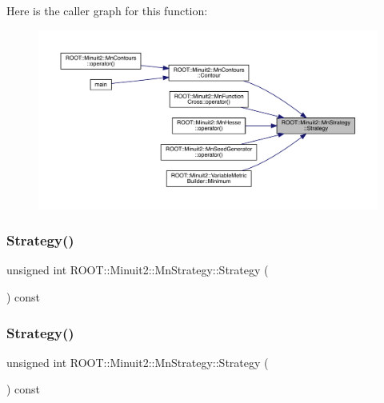 Here is the caller graph for this function\+:
\nopagebreak
\begin{figure}[H]
\begin{center}
\leavevmode
\includegraphics[width=350pt]{da/de4/classROOT_1_1Minuit2_1_1MnStrategy_a1ff03f5ccec83aa19770d080b2be2334_icgraph}
\end{center}
\end{figure}
\mbox{\label{classROOT_1_1Minuit2_1_1MnStrategy_a1ff03f5ccec83aa19770d080b2be2334}} 
\subsubsection{\texorpdfstring{Strategy()}{Strategy()}\hspace{0.1cm}{\footnotesize\ttfamily [2/3]}}
{\footnotesize\ttfamily unsigned int R\+O\+O\+T\+::\+Minuit2\+::\+Mn\+Strategy\+::\+Strategy (\begin{DoxyParamCaption}{ }\end{DoxyParamCaption}) const\hspace{0.3cm}{\ttfamily [inline]}}

\mbox{\label{classROOT_1_1Minuit2_1_1MnStrategy_a1ff03f5ccec83aa19770d080b2be2334}} 
\subsubsection{\texorpdfstring{Strategy()}{Strategy()}\hspace{0.1cm}{\footnotesize\ttfamily [3/3]}}
{\footnotesize\ttfamily unsigned int R\+O\+O\+T\+::\+Minuit2\+::\+Mn\+Strategy\+::\+Strategy (\begin{DoxyParamCaption}{ }\end{DoxyParamCaption}) const\hspace{0.3cm}{\ttfamily [inline]}}



